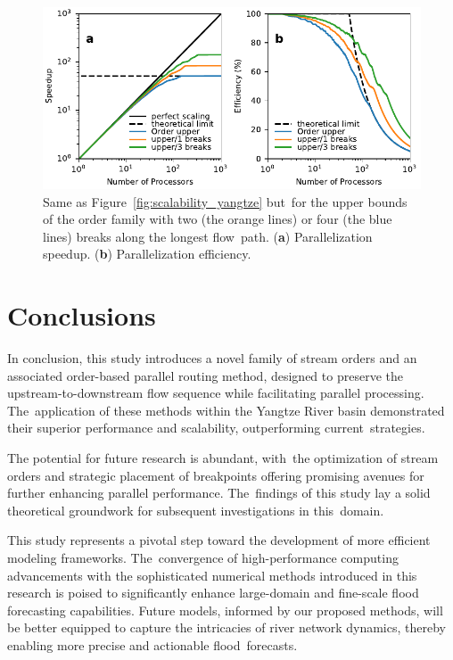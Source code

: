 \documentclass[water,article,accept,pdftex,moreauthors]{Definitions/mdpi}
\begin{document}
\begin{figure}[H]
    \includegraphics[width=13.5cm]{fig/speedup_bd_yangtze.pdf}
    \caption{Same as Figure~\ref{fig:scalability_yangtze} but~for the upper bounds of the order family with two (the orange lines) or four (the blue lines) breaks along the longest flow~path. (\textbf{a}) Parallelization speedup. (\textbf{b}) Parallelization efficiency. \label{fig:scalability_breakdown_yangtze}}
\end{figure}
\unskip


\section{Conclusions}
\label{sec:conclusions}

In conclusion, this study introduces a novel family of stream orders and an associated order-based parallel routing method, designed to preserve the upstream-to-downstream flow sequence while facilitating parallel processing. The~application of these methods within the Yangtze River basin demonstrated their superior performance and scalability, outperforming current~strategies.

The potential for future research is abundant, with~the optimization of stream orders and strategic placement of breakpoints offering promising avenues for further enhancing parallel performance. The~findings of this study lay a solid theoretical groundwork for subsequent investigations in this~domain.

This study represents a pivotal step toward the development of more efficient modeling frameworks. The~convergence of high-performance computing advancements with the sophisticated numerical methods introduced in this research is poised to significantly enhance large-domain and fine-scale flood forecasting capabilities. Future models, informed by our proposed methods, will be better equipped to capture the intricacies of river network dynamics, thereby enabling more precise and actionable flood~forecasts.
\end{document}
